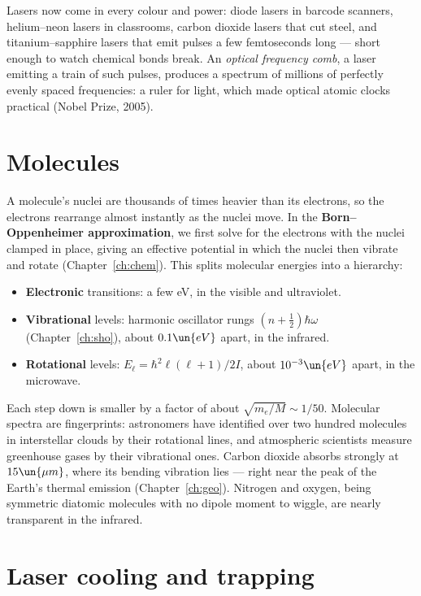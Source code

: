 Lasers now come in every colour and power: diode lasers in barcode scanners, helium--neon lasers in classrooms, carbon dioxide lasers that cut steel, and titanium--sapphire lasers that emit pulses a few femtoseconds long --- short enough to watch chemical bonds break. An \emph{optical frequency comb}, a laser emitting a train of such pulses, produces a spectrum of millions of perfectly evenly spaced frequencies: a ruler for light, which made optical atomic clocks practical (Nobel Prize, 2005).

\section{Molecules}

A molecule's nuclei are thousands of times heavier than its electrons, so the electrons rearrange almost instantly as the nuclei move. In the \textbf{Born--Oppenheimer approximation}, we first solve for the electrons with the nuclei clamped in place, giving an effective potential in which the nuclei then vibrate and rotate (Chapter~\ref{ch:chem}). This splits molecular energies into a hierarchy:
\begin{itemize}[itemsep=3pt]
  \item \textbf{Electronic} transitions: a few eV, in the visible and ultraviolet.
  \item \textbf{Vibrational} levels: harmonic oscillator rungs $(n+\tfrac12)\hbar\omega$ (Chapter~\ref{ch:sho}), about $0.1\un{eV}$ apart, in the infrared.
  \item \textbf{Rotational} levels: $E_\ell = \hbar^2\ell(\ell+1)/2I$, about $10^{-3}\un{eV}$ apart, in the microwave.
\end{itemize}
Each step down is smaller by a factor of about $\sqrt{m_e/M}\sim1/50$. Molecular spectra are fingerprints: astronomers have identified over two hundred molecules in interstellar clouds by their rotational lines, and atmospheric scientists measure greenhouse gases by their vibrational ones. Carbon dioxide absorbs strongly at $15\un{\mu m}$, where its bending vibration lies --- right near the peak of the Earth's thermal emission (Chapter~\ref{ch:geo}). Nitrogen and oxygen, being symmetric diatomic molecules with no dipole moment to wiggle, are nearly transparent in the infrared.

\section{Laser cooling and trapping}

